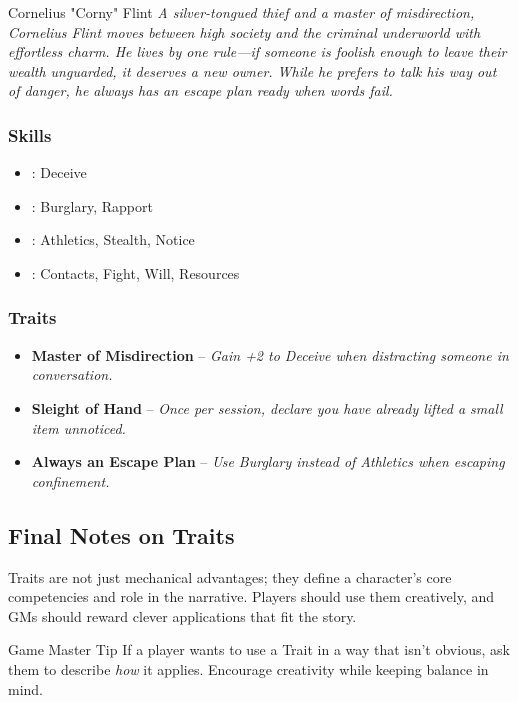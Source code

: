 \begin{WyrdNPC}[float=!t]{Cornelius "Corny" Flint}
	\emph{A silver-tongued thief and a master of misdirection, Cornelius Flint moves between high society and the criminal underworld with effortless charm. He lives by one rule—if someone is foolish enough to leave their wealth unguarded, it deserves a new owner. While he prefers to talk his way out of danger, he always has an escape plan ready when words fail.}

	\subsubsection*{Skills}
	\begin{itemize}
    	\item \Expert: Deceive
	    \item \Skilled: Burglary, Rapport
    	\item \Novice: Athletics, Stealth, Notice
	    \item \Untrained: Contacts, Fight, Will, Resources
	\end{itemize}

	\subsubsection*{Traits}
	\begin{itemize}
    	\item \textbf{Master of Misdirection} – \emph{Gain +2 to Deceive when distracting someone in conversation.}
	    \item \textbf{Sleight of Hand} – \emph{Once per session, declare you have already lifted a small item unnoticed.}
	    \item \textbf{Always an Escape Plan} – \emph{Use Burglary instead of Athletics when escaping confinement.}
	\end{itemize}
\end{WyrdNPC}

 
\subsection{Final Notes on Traits}

Traits are not just mechanical advantages; they define a character’s core competencies and role in the narrative. Players should use them creatively, and GMs should reward clever applications that fit the story.

\begin{DndComment}{Game Master Tip}
 	If a player wants to use a Trait in a way that isn’t obvious, ask them to describe \emph{how} it applies. Encourage creativity while keeping balance in mind.
\end{DndComment}

